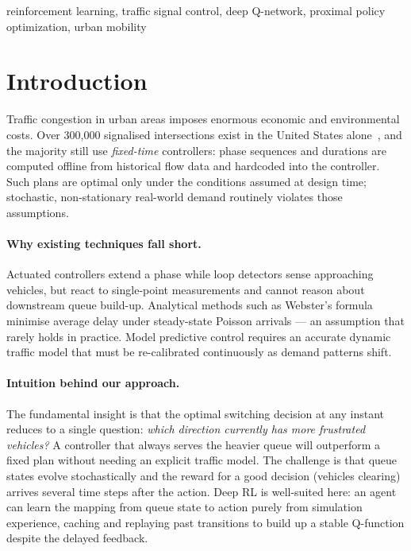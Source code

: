 \documentclass[twoside,11pt]{article}
\begin{document}
\begin{keywords}
  reinforcement learning, traffic signal control, deep Q-network,
  proximal policy optimization, urban mobility
\end{keywords}

\section{Introduction}

Traffic congestion in urban areas imposes enormous economic and environmental
costs.  Over 300,000 signalised intersections exist in the United States
alone~\citep{schrank2021tti}, and the majority still use \emph{fixed-time}
controllers: phase sequences and durations are computed offline from historical
flow data and hardcoded into the controller.  Such plans are optimal only under
the conditions assumed at design time; stochastic, non-stationary real-world
demand routinely violates those assumptions.

\paragraph{Why existing techniques fall short.}
Actuated controllers extend a phase while loop detectors sense approaching
vehicles, but react to single-point measurements and cannot reason about
downstream queue build-up.  Analytical methods such as Webster's
formula~\citep{webster1958} minimise average delay under steady-state Poisson
arrivals — an assumption that rarely holds in practice.  Model predictive
control requires an accurate dynamic traffic model that must be re-calibrated
continuously as demand patterns shift.

\paragraph{Intuition behind our approach.}
The fundamental insight is that the optimal switching decision at any instant
reduces to a single question: \emph{which direction currently has more
frustrated vehicles?}  A controller that always serves the heavier queue
will outperform a fixed plan without needing an explicit traffic model.
The challenge is that queue states evolve stochastically and the reward for
a good decision (vehicles clearing) arrives several time steps after the action.
Deep RL is well-suited here: an agent can learn the mapping from queue state to
action purely from simulation experience, caching and replaying past transitions
to build up a stable Q-function despite the delayed feedback.
\end{document}
